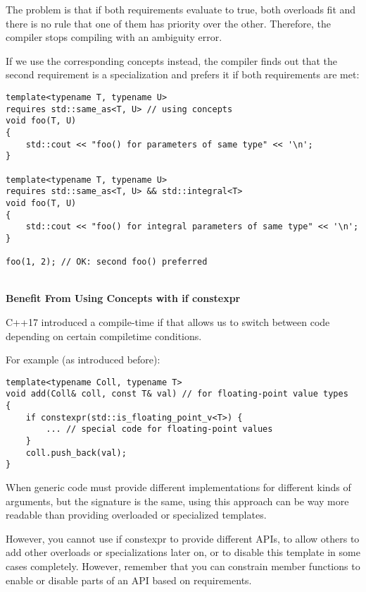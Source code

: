 The problem is that if both requirements evaluate to true, both overloads fit and there is no rule that one of them has priority over the other. Therefore, the compiler stops compiling with an ambiguity error.

If we use the corresponding concepts instead, the compiler finds out that the second requirement is a specialization and prefers it if both requirements are met:

\begin{lstlisting}[style=styleCXX]
template<typename T, typename U>
requires std::same_as<T, U> // using concepts
void foo(T, U)
{
	std::cout << "foo() for parameters of same type" << '\n';
}

template<typename T, typename U>
requires std::same_as<T, U> && std::integral<T>
void foo(T, U)
{
	std::cout << "foo() for integral parameters of same type" << '\n';
}

foo(1, 2); // OK: second foo() preferred
\end{lstlisting}

\noindent
\hspace*{\fill} \\ %
\textbf{Benefit From Using Concepts with if constexpr}

C++17 introduced a compile-time if that allows us to switch between code depending on certain compiletime conditions.

For example (as introduced before):

\begin{lstlisting}[style=styleCXX]
template<typename Coll, typename T>
void add(Coll& coll, const T& val) // for floating-point value types
{
	if constexpr(std::is_floating_point_v<T>) {
		... // special code for floating-point values
	}
	coll.push_back(val);
}
\end{lstlisting}

When generic code must provide different implementations for different kinds of arguments, but the signature is the same, using this approach can be way more readable than providing overloaded or specialized templates.

However, you cannot use if constexpr to provide different APIs, to allow others to add other overloads or specializations later on, or to disable this template in some cases completely. However, remember that you can constrain member functions to enable or disable parts of an API based on requirements.








